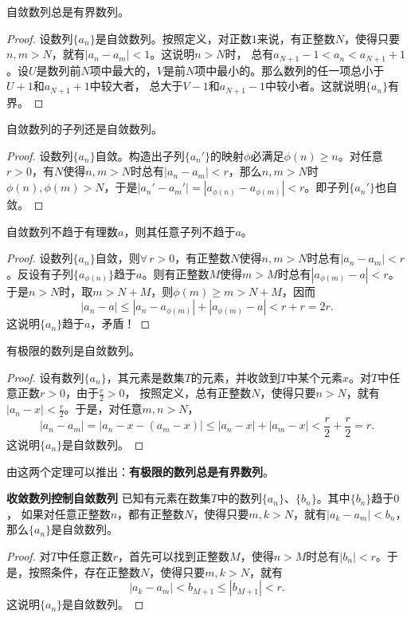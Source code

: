 \documentclass[12pt,UTF8,fontset=none]{ctexbook}
\begin{document}
\begin{appendix}
\begin{tm}\label{tm:a-0-60}
    自敛数列总是有界数列。
\end{tm}
\begin{proof}
    设数列$\{a_n\}$是自敛数列。按照定义，对正数$1$来说，有正整数$N$，使得只要$n,m>N$，就有$|a_n - a_m| < 1$。这说明$n>N$时，
    总有$a_{N+1} - 1 < a_n < a_{N+1} + 1$。设$U$是数列前$N$项中最大的，$V$是前$N$项中最小的。那么数列的任一项总小于$U+1$和$a_{N+1}+1$中较大者，
    总大于$V-1$和$a_{N+1}-1$中较小者。这就说明$\{a_n\}$有界。
\end{proof}

\begin{tm}\label{tm:a-0-65}
    自敛数列的子列还是自敛数列。
\end{tm}
\begin{proof}
    设数列$\{a_n\}$自敛。构造出子列$\{a_n'\}$的映射$\phi$必满足$\phi(n)\geqslant n$。对任意$r>0$，有$N$使得$n,m>N$时总有$|a_n - a_m| < r$，那么$n,m>N$时$\phi(n),\phi(m)>N$，于是$|a_n' - a_m'| = |a_{\phi(n)} - a_{\phi(m)}| < r$。即子列$\{a_n'\}$也自敛。
\end{proof}

\begin{tm}\label{tm:a-0-67}
    自敛数列不趋于有理数$a$，则其任意子列不趋于$a$。
\end{tm}
\begin{proof}
    设数列$\{a_n\}$自敛，则$\forall \, r > 0$，有正整数$N$使得$n,m>N$时总有$|a_n - a_m| < r$。反设有子列$\{a_{\phi(n)}\}$趋于$a$。则有正整数$M$使得$m>M$时总有$|a_{\phi(m)} - a| < r$。于是$n>N$时，取$m>N+M$，则$\phi(m)\geqslant m>N+M$，因而
    $$ |a_n - a| \leqslant |a_n - a_{\phi(m)}| + |a_{\phi(m)} - a| < r + r = 2r.$$
    这说明$\{a_n\}$趋于$a$，矛盾！
\end{proof}

\begin{tm}\label{tm:a-0-70}
    有极限的数列是自敛数列。
\end{tm}
\begin{proof}
    设有数列$\{a_n\}$，其元素是数集$T$的元素，并收敛到$T$中某个元素$x$。对$T$中任意正数$r>0$，由于$\frac{r}{2}>0$，
    按照定义，总有正整数$N$，使得只要$n>N$，就有$|a_n - x| < \frac{r}{2}$。于是，对任意$m,n>N$，
    $$ |a_n - a_m| = |a_n - x - (a_m - x)| \leqslant |a_n - x| + |a_m - x| < \frac{r}{2} + \frac{r}{2} = r.$$
    这说明$\{a_n\}$是自敛数列。
\end{proof}

由这两个定理可以推出：\textbf{有极限的数列总是有界数列}。

\begin{tm}{\textbf{收敛数列控制自敛数列}}\label{tm:a-0-80}
    已知有元素在数集$T$中的数列$\{a_n\}$、$\{b_n\}$。其中$\{b_n\}$趋于$0$，
    如果对任意正整数$n$，都有正整数$N$，使得只要$m,k>N$，就有$|a_k - a_m| < b_n$，那么$\{a_n\}$是自敛数列。
\end{tm}
\begin{proof}
    对$T$中任意正数$r$，首先可以找到正整数$M$，使得$n>M$时总有$|b_n| < r$。于是，按照条件，存在正整数$N$，使得只要$m,k>N$，就有
    $$|a_k - a_m| < b_{M+1} \leqslant |b_{M+1}| < r.$$
    这说明$\{a_n\}$是自敛数列。
\end{proof}


\end{appendix}
\end{document}

